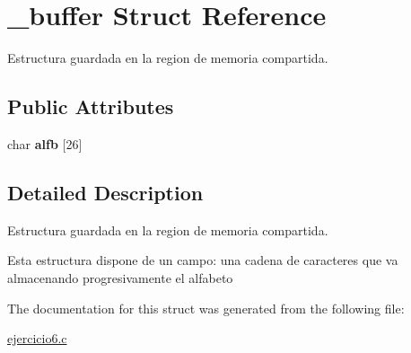 \hypertarget{struct__buffer}{\section{\-\_\-buffer Struct Reference}
\label{struct__buffer}
}


Estructura guardada en la region de memoria compartida.  


\subsection*{Public Attributes}
\begin{DoxyCompactItemize}
\item 
\hypertarget{struct__buffer_a170ef9529a09f3a8ad780a9ce158a879}{char {\bfseries alfb} \mbox{[}26\mbox{]}}\label{struct__buffer_a170ef9529a09f3a8ad780a9ce158a879}

\end{DoxyCompactItemize}


\subsection{Detailed Description}
Estructura guardada en la region de memoria compartida. 

Esta estructura dispone de un campo\-: una cadena de caracteres que va almacenando progresivamente el alfabeto 

The documentation for this struct was generated from the following file\-:\begin{DoxyCompactItemize}
\item 
\hyperlink{ejercicio6_8c}{ejercicio6.\-c}\end{DoxyCompactItemize}
